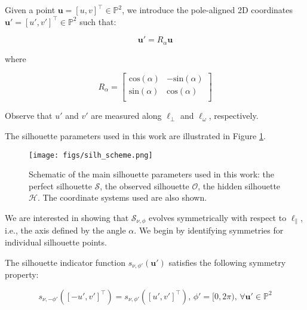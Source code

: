 \begin{definition}
    \label{def:u'}
    Given a point $\mathbf{u}=[u,v]^\top\in\mathbb{P}^2$, we introduce the pole-aligned 2D coordinates $\mathbf{u}'=[u',v']^\top\in\mathbb{P}^2$ such that:

    \begin{equation}
        \mathbf{u}' = R_\alpha \mathbf{u}
    \end{equation}

    where

    \begin{equation}
        R_\alpha = 
        \begin{bmatrix}
            \mathrm{cos}(\alpha) & -\mathrm{sin}(\alpha)\\
            \mathrm{sin}(\alpha) & \mathrm{cos}(\alpha)\\
        \end{bmatrix}
    \end{equation}

    Observe that $u'$ and $v'$ are measured along $\ell_\perp$ and $\ell_\omega$, respectively.
\end{definition}

The silhouette parameters used in this work are illustrated in Figure \ref{fig:silh_scheme}.

\begin{figure}
    \centering
    \texttt{[image: figs/silh\_scheme.png]}
    \caption{Schematic of the main silhouette parameters used in this work: the perfect silhouette $\mathcal{S}$, the observed silhouette $\mathcal{O}$, the hidden silhouette $\mathcal{H}$. The coordinate systems used are also shown.}
    \label{fig:silh_scheme}
\end{figure}


We are interested in showing that $\mathcal{S}_{\nu,\phi}$ evolves symmetrically with respect to $\ell_\parallel$, i.e., the axis defined by the angle $\alpha$. We begin by identifying symmetries for individual silhouette points.

\begin{lemma}
    \label{lemma:s_v}
    The silhouette indicator function $s_{\nu,\phi'}(\mathbf{u}')$ satisfies the following symmetry property:

    \begin{equation}
        s_{\nu,-\phi'}([-u',v']^\top) = s_{\nu,\phi'}([u',v']^\top), \, \phi' = [0,2\pi),\, \forall \mathbf{u}' \in \mathbb{P}^2
    \end{equation}
\end{lemma}

